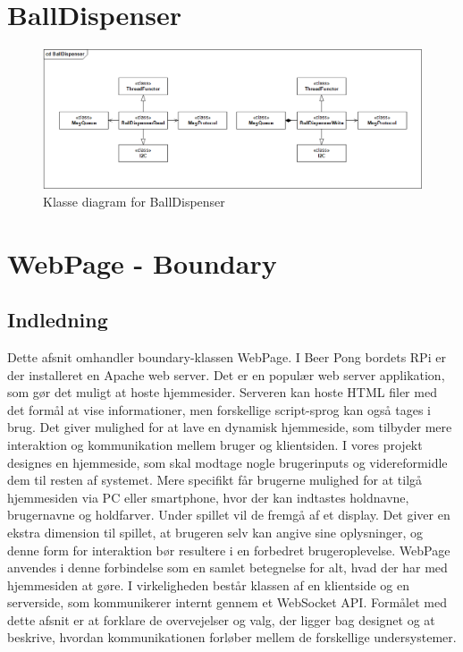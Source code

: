 \documentclass[Softwaredesign/Softwaredesign_main.tex]{subfiles}
\begin{document}
\section{BallDispenser}
\begin{figure}[H]
    \centering
    \includegraphics[width=1\textwidth]{Softwaredesign/RPiApp/graphic_RPi/BD.png}
    \caption{Klasse diagram for BallDispenser}
   \label{fig:dispatch}
\end{figure}


\section{WebPage - Boundary}
\subsection{Indledning}
Dette afsnit omhandler boundary-klassen WebPage. I Beer Pong bordets RPi er der installeret en Apache web server. Det er en populær web server applikation, som gør det muligt at hoste hjemmesider. Serveren kan hoste HTML filer med det formål at vise informationer, men forskellige script-sprog kan også tages i brug. Det giver mulighed for at lave en dynamisk hjemmeside, som tilbyder mere interaktion og kommunikation mellem bruger og klientsiden. I vores projekt designes en hjemmeside, som skal modtage nogle brugerinputs og videreformidle dem til resten af systemet. Mere specifikt får brugerne mulighed for at tilgå hjemmesiden via PC eller smartphone, hvor der kan indtastes holdnavne, brugernavne og holdfarver. Under spillet vil de fremgå af et display. Det giver en ekstra dimension til spillet, at brugeren selv kan angive sine oplysninger, og denne form for interaktion bør resultere i en forbedret brugeroplevelse. WebPage anvendes i denne forbindelse som en samlet betegnelse for alt, hvad der har med hjemmesiden at gøre. I virkeligheden består klassen af en klientside og en serverside, som kommunikerer internt gennem et WebSocket API. Formålet med dette afsnit er at forklare de overvejelser og valg, der ligger bag designet og at beskrive, hvordan kommunikationen forløber mellem de forskellige undersystemer.
\end{document}
